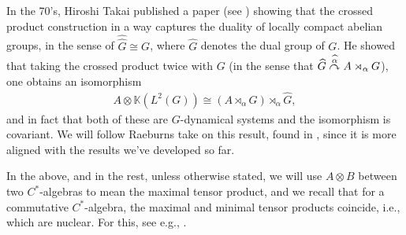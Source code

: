In the 70's, Hiroshi Takai published a paper (see \cite{takai1975duality}) showing that the crossed product construction in a way captures the duality of locally compact abelian groups, in the sense of $\hat{\hat G} \cong G$, where $\hat G$ denotes the dual group of $G$. He showed that taking the crossed product twice with $G$ (in the sense that $\widehat{G} \stackrel{\widehat{\alpha}}{\curvearrowright} A \rtimes_\alpha G$), one obtains an isomorphism 
\begin{align*}
A \otimes \mathbb{K}(L^2(G)) \cong (A \rtimes_\alpha G) \rtimes_{\hat \alpha} \hat G,
\end{align*}
and in fact that both of these are $G$-dynamical systems and the isomorphism is covariant.  We will follow Raeburns take on this result, found in \cite{raeburn1988crossed}, since it is more aligned with the results we've developed so far.
\begin{note}
In the above, and in the rest, unless otherwise stated, we will use $A \otimes B$ between two $C^*$-algebras to mean the maximal tensor product, and we recall that for a commutative $C^*$-algebra, the maximal and minimal tensor products coincide, i.e., which are nuclear. For this, see e.g., \cite{brown2008c}.
\end{note}

